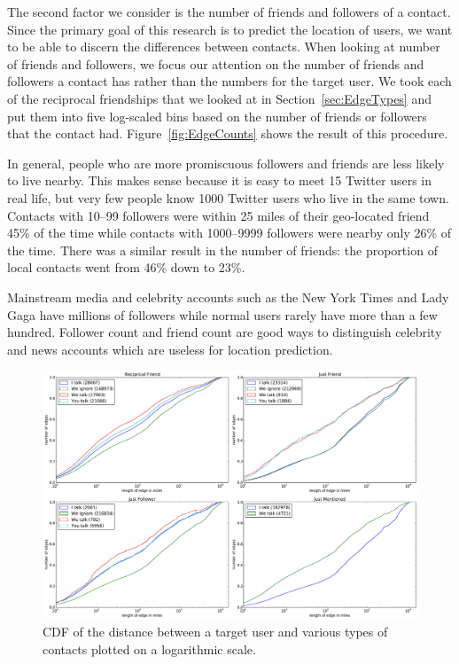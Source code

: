 The second factor we consider is the number of friends and followers of a contact.
%
Since the primary goal of this research is to predict the location of users, we
want to be able to discern the differences between contacts.
%
When looking at number of friends and followers, we focus our attention on the
number of friends and followers a contact has rather than the numbers for the
target user.
%
We took each of the reciprocal friendships that we looked at in
Section~\ref{sec:EdgeTypes} and put them into five log-scaled bins based on
the number of friends or followers that the contact had.
%
Figure~\ref{fig:EdgeCounts} shows the result of this procedure.

In general, people who are more promiscuous followers and friends are less
likely to live nearby.
%
This makes sense because it is easy to meet 15 Twitter users in real life, but
very few people know 1000 Twitter users who live in the same town.
%
Contacts with 10--99 followers were within 25 miles of their geo-located friend
45\% of the time while contacts with 1000--9999 followers were nearby only 26\%
of the time.
%
There was a similar result in the number of friends: the proportion of local
contacts went from 46\% down to 23\%.

Mainstream media and celebrity accounts such as the New York Times and Lady
Gaga have millions of followers while normal users rarely have more than a few
hundred.
%
Follower count and friend count are good ways to distinguish celebrity and news
accounts which are useless for location prediction.

\ifdefined\THESIS
    \begin{figure}[tbh]
    \centering
    \includegraphics[width=\linewidth]{figures/com_types.pdf}
    \caption{
    CDF of the distance between a target user and various types of contacts
    plotted on a logarithmic scale.
    }
    \label{fig:ComTypes}
    \end{figure}
\fi


